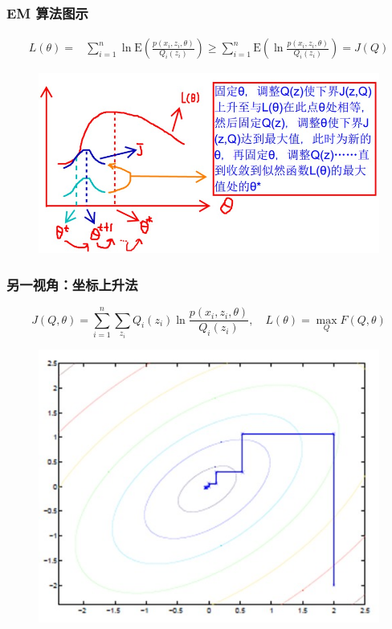 \documentclass{beamer}
\def\E{\mathrm{E}}
\newcommand{\Gh}{\theta}
\begin{document}
\begin{frame}
    \frametitle{EM 算法图示}

    \[\begin{split}
        L(\Gh) = & \sum_{i = 1}^{n}\ln \E(\frac{p(x_i, z_i, \Gh)}{Q_i(z_i)}) \geq \sum_{i = 1}^{n} \E(\ln \frac{p(x_i, z_i, \Gh)}{Q_i(z_i)}) = J(Q)
    \end{split}\]
    
    \begin{figure}
        \centering
        \includegraphics[width=.8\textwidth]{res/em_function.png}
    \end{figure}

\end{frame}

\begin{frame}
    \frametitle{另一视角：坐标上升法}

    \[J(Q, \Gh) = \sum_{i = 1}^{n}\sum_{z_i}Q_i(z_i)\ln \frac{p(x_i, z_i, \Gh)}{Q_i(z_i)},\quad L(\Gh) = \max_{Q}F(Q, \Gh)\]

    \begin{figure}
        \centering
        \includegraphics[width=.6\textwidth]{res/coordinate_ascent.png}
    \end{figure}

\end{frame}
\end{document}
